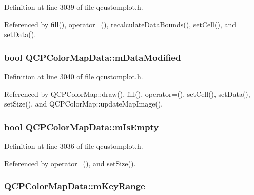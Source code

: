 Definition at line 3039 of file qcustomplot.\+h.



Referenced by fill(), operator=(), recalculate\+Data\+Bounds(), set\+Cell(), and set\+Data().

\hypertarget{class_q_c_p_color_map_data_ad3cc682da2ac14e5acdbc05cf4d3d93b}{}
\subsubsection[{m\+Data\+Modified}]{\setlength{\rightskip}{0pt plus 5cm}bool Q\+C\+P\+Color\+Map\+Data\+::m\+Data\+Modified\hspace{0.3cm}{\ttfamily [protected]}}\label{class_q_c_p_color_map_data_ad3cc682da2ac14e5acdbc05cf4d3d93b}


Definition at line 3040 of file qcustomplot.\+h.



Referenced by Q\+C\+P\+Color\+Map\+::draw(), fill(), operator=(), set\+Cell(), set\+Data(), set\+Size(), and Q\+C\+P\+Color\+Map\+::update\+Map\+Image().

\hypertarget{class_q_c_p_color_map_data_a10e91aa89ed05bd177b1f81e07b465b8}{}
\subsubsection[{m\+Is\+Empty}]{\setlength{\rightskip}{0pt plus 5cm}bool Q\+C\+P\+Color\+Map\+Data\+::m\+Is\+Empty\hspace{0.3cm}{\ttfamily [protected]}}\label{class_q_c_p_color_map_data_a10e91aa89ed05bd177b1f81e07b465b8}


Definition at line 3036 of file qcustomplot.\+h.



Referenced by operator=(), and set\+Size().

\hypertarget{class_q_c_p_color_map_data_aaaafd0d7d0f153dbd152f3daf34254ee}{}
\subsubsection[{m\+Key\+Range}]{ Q\+C\+P\+Color\+Map\+Data\+::m\+Key\+Range\hspace{0.3cm}{\ttfamily [protected]}}\label{class_q_c_p_color_map_data_aaaafd0d7d0f153dbd152f3daf34254ee}


